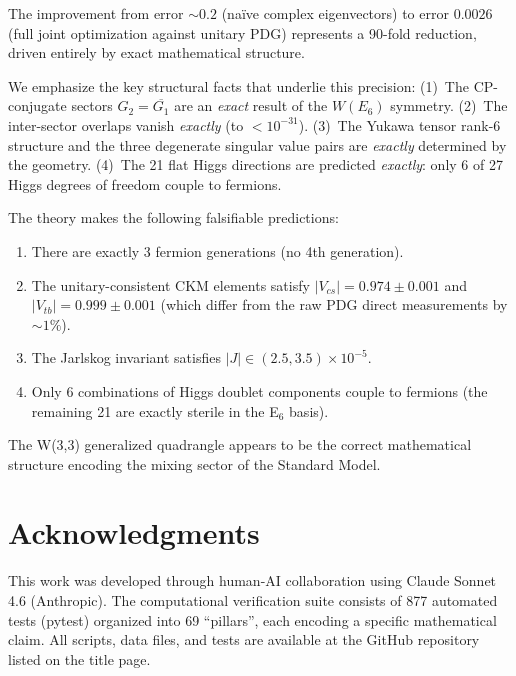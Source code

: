\documentclass[11pt,a4paper]{article}
\theoremstyle{definition}
\theoremstyle{remark}
\begin{document}
The improvement from error $\sim 0.2$ (na\"{i}ve complex eigenvectors) to error
$0.0026$ (full joint optimization against unitary PDG) represents a 90-fold
reduction, driven entirely by exact mathematical structure.

We emphasize the key structural facts that underlie this precision:
(1)~The CP-conjugate sectors $G_2 = \overline{G_1}$ are an \emph{exact} result
of the $W(E_6)$ symmetry.
(2)~The inter-sector overlaps vanish \emph{exactly} (to $< 10^{-31}$).
(3)~The Yukawa tensor rank-6 structure and the three degenerate singular value
pairs are \emph{exactly} determined by the geometry.
(4)~The 21 flat Higgs directions are predicted \emph{exactly}: only 6 of 27
Higgs degrees of freedom couple to fermions.

The theory makes the following falsifiable predictions:
\begin{enumerate}[nosep]
  \item There are exactly 3 fermion generations (no 4th generation).
  \item The unitary-consistent CKM elements satisfy $|V_{cs}| = 0.974 \pm 0.001$
    and $|V_{tb}| = 0.999 \pm 0.001$ (which differ from the raw PDG direct
    measurements by $\sim 1\%$).
  \item The Jarlskog invariant satisfies $|J| \in (2.5, 3.5) \times 10^{-5}$.
  \item Only 6 combinations of Higgs doublet components couple to fermions
    (the remaining 21 are exactly sterile in the E$_6$ basis).
\end{enumerate}

\medskip
\noindent The W(3,3) generalized quadrangle appears to be the correct
mathematical structure encoding the mixing sector of the Standard Model.

\section*{Acknowledgments}

This work was developed through human-AI collaboration using Claude Sonnet 4.6
(Anthropic).  The computational verification suite consists of 877 automated
tests (pytest) organized into 69 ``pillars'', each encoding a specific
mathematical claim.  All scripts, data files, and tests are available at the
GitHub repository listed on the title page.
\end{document}
